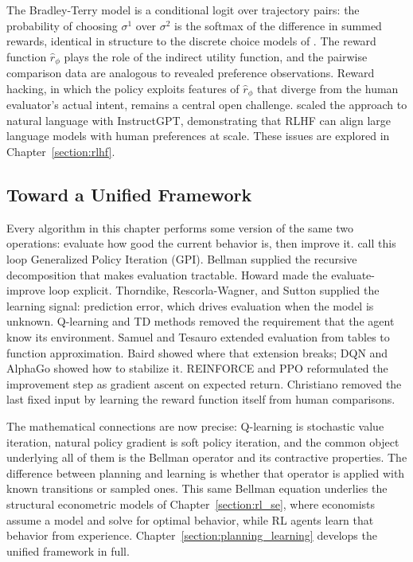 The Bradley-Terry model is a conditional logit over trajectory pairs: the probability of choosing $\sigma^1$ over $\sigma^2$ is the softmax of the difference in summed rewards, identical in structure to the discrete choice models of \citet{McFadden1974}. The reward function $\hat{r}_\phi$ plays the role of the indirect utility function, and the pairwise comparison data are analogous to revealed preference observations. Reward hacking, in which the policy exploits features of $\hat{r}_\phi$ that diverge from the human evaluator's actual intent, remains a central open challenge. \citet{Ouyang2022} scaled the approach to natural language with InstructGPT, demonstrating that RLHF can align large language models with human preferences at scale. These issues are explored in Chapter~\ref{section:rlhf}.

\subsection{Toward a Unified Framework}

Every algorithm in this chapter performs some version of the same two operations: evaluate how good the current behavior is, then improve it. \citet{sutton2018} call this loop Generalized Policy Iteration (GPI). Bellman supplied the recursive decomposition that makes evaluation tractable. Howard made the evaluate-improve loop explicit. Thorndike, Rescorla-Wagner, and Sutton supplied the learning signal: prediction error, which drives evaluation when the model is unknown. Q-learning and TD methods removed the requirement that the agent know its environment. Samuel and Tesauro extended evaluation from tables to function approximation. Baird showed where that extension breaks; DQN and AlphaGo showed how to stabilize it. REINFORCE and PPO reformulated the improvement step as gradient ascent on expected return. Christiano removed the last fixed input by learning the reward function itself from human comparisons.

The mathematical connections are now precise: Q-learning is stochastic value iteration, natural policy gradient is soft policy iteration, and the common object underlying all of them is the Bellman operator and its contractive properties. The difference between planning and learning is whether that operator is applied with known transitions or sampled ones. This same Bellman equation underlies the structural econometric models of Chapter~\ref{section:rl_se}, where economists assume a model and solve for optimal behavior, while RL agents learn that behavior from experience. Chapter~\ref{section:planning_learning} develops the unified framework in full.
